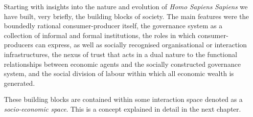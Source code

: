 \medskip\noindent Starting with insights into the nature and evolution of \emph{Homo Sapiens Sapiens} we have built, very briefly, the building blocks of society. The main features were the boundedly rational consumer-producer itself, the governance system as a collection of informal and formal institutions, the roles in which consumer-producers can express, as well as socially recognised organisational or interaction infrastructures, the nexus of trust that acts in a dual nature to the functional relationships between economic agents and the socially constructed governance system, and the social division of labour within which all economic wealth is generated.

These building blocks are contained within some interaction space denoted as a \emph{socio-economic space}. This is a concept explained in detail in the next chapter.


